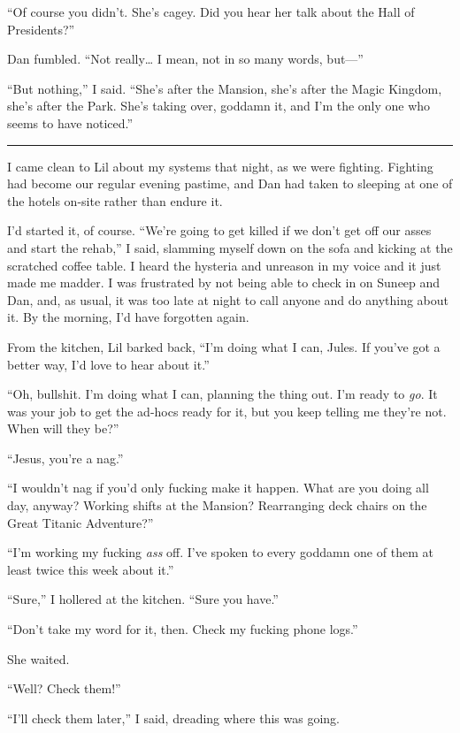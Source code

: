 “Of course you didn't. She's cagey. Did you hear her talk about the
Hall of Presidents?”

Dan fumbled. “Not really… I mean, not in so many words, but—”

“But nothing,” I said. “She's after the Mansion, she's after the
Magic Kingdom, she's after the Park. She's taking over, goddamn it,
and I'm the only one who seems to have noticed.”

\begin{center}\rule{3in}{0.4pt}\end{center}

I came clean to Lil about my systems that night, as we were
fighting. Fighting had become our regular evening pastime, and Dan
had taken to sleeping at one of the hotels on-site rather than
endure it.

I'd started it, of course. “We're going to get killed if we don't
get off our asses and start the rehab,” I said, slamming myself
down on the sofa and kicking at the scratched coffee table. I heard
the hysteria and unreason in my voice and it just made me madder. I
was frustrated by not being able to check in on Suneep and Dan,
and, as usual, it was too late at night to call anyone and do
anything about it. By the morning, I'd have forgotten again.

From the kitchen, Lil barked back, “I'm doing what I can, Jules. If
you've got a better way, I'd love to hear about it.”

“Oh, bullshit. I'm doing what I can, planning the thing out. I'm
ready to \emph{go}. It was your job to get the ad-hocs ready for
it, but you keep telling me they're not. When will they be?”

“Jesus, you're a nag.”

“I wouldn't nag if you'd only fucking make it happen. What are you
doing all day, anyway? Working shifts at the Mansion? Rearranging
deck chairs on the Great Titanic Adventure?”

“I'm working my fucking \emph{ass} off. I've spoken to every
goddamn one of them at least twice this week about it.”

“Sure,” I hollered at the kitchen. “Sure you have.”

“Don't take my word for it, then. Check my fucking phone logs.”

She waited.

“Well? Check them!”

“I'll check them later,” I said, dreading where this was going.

